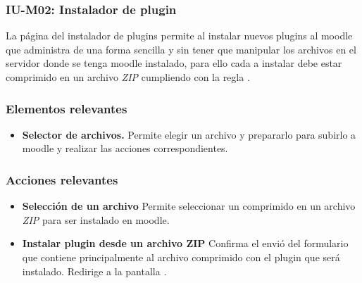 
\subsubsection{IU-M02: Instalador de plugin}

 La página del instalador de plugins permite al  instalar nuevos plugins al
 moodle que administra de una forma sencilla y sin tener que manipular los archivos en el servidor
 donde se tenga moodle instalado, para ello cada  a instalar debe estar
 comprimido en un archivo {\it ZIP} cumpliendo con la regla .


\subsubsection{Elementos relevantes}

    \begin{itemize}
    \item {\bf Selector de archivos.}
        Permite elegir un archivo y prepararlo para subirlo a moodle
        y realizar las acciones correspondientes.
    \end{itemize}

\subsubsection{Acciones relevantes}

    \begin{itemize}
    \item {\bf Selección de un archivo}
        Permite seleccionar un  comprimido en un archivo {\it ZIP} para
        ser instalado en moodle.

    \item {\bf Instalar plugin desde un archivo ZIP}
        Confirma el envió del formulario que contiene principalmente al archivo comprimido con
        el plugin que será instalado. Redirige a la pantalla .
    \end{itemize}

\clearpage
